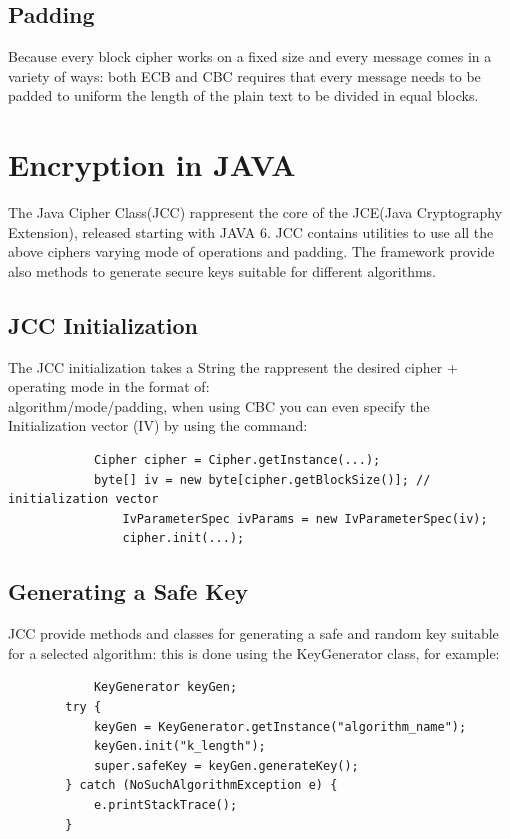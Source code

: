 \documentclass{article}
\begin{document}
	\subsection{Padding}
	Because every block cipher works on a fixed size and every message comes in a variety of ways: both ECB and CBC requires that every message needs to be padded to uniform the length of the plain text to be divided in equal blocks.
	
	
\section{Encryption in JAVA}\label{sec:encJava}

The Java Cipher Class(JCC) rappresent the core of the JCE(Java Cryptography Extension), released starting with JAVA 6.
JCC contains utilities to use all the above ciphers varying mode of operations and padding.
The framework provide also methods to generate secure keys suitable for different algorithms.

	\subsection{JCC Initialization}
		The JCC initialization takes a String the rappresent the desired cipher + operating mode in the format of:\\ algorithm/mode/padding, when using CBC you can even specify the Initialization vector (IV) by using the command: \\ 
		
		\begin{verbatim}
			Cipher cipher = Cipher.getInstance(...);
			byte[] iv = new byte[cipher.getBlockSize()]; // initialization vector
				IvParameterSpec ivParams = new IvParameterSpec(iv);
				cipher.init(...);
		\end{verbatim}

	\subsection{Generating a Safe Key}
		JCC provide methods and classes for generating a safe and random key suitable for a selected algorithm: this is done using the KeyGenerator class, for example:
		
		\begin{verbatim}
			KeyGenerator keyGen;
		try {
			keyGen = KeyGenerator.getInstance("algorithm_name");
			keyGen.init("k_length");
			super.safeKey = keyGen.generateKey();
		} catch (NoSuchAlgorithmException e) {
			e.printStackTrace();
		}		\end{verbatim}
		
\end{document}
